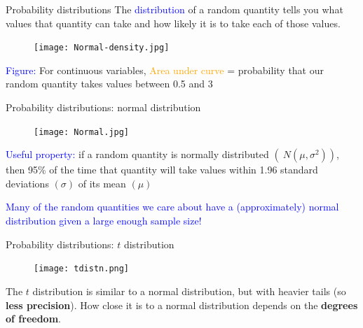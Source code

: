 \documentclass[10pt,t]{beamer}
\begin{document}
\begin{frame}{Probability distributions}
The \textcolor{blue}{distribution} of a random quantity tells you what values that quantity can take and how likely it is to take each of those values.

\begin{figure}
	\centering \texttt{[image: Normal-density.jpg]}
\end{figure}

\textcolor{blue}{Figure:} For continuous variables, \textcolor{orange}{Area under curve} = probability that our random quantity takes values between 0.5 and 3

\end{frame}



\begin{frame}{Probability distributions: normal distribution}

\begin{figure}
	\centering \texttt{[image: Normal.jpg]}
\end{figure}

\textcolor{blue}{Useful property:} if a random quantity is normally distributed $(~N(\mu, \sigma^2))$, then 95\% of the time that quantity will take values within 1.96 standard deviations $(\sigma)$ of its mean $(\mu)$

\vspace{0.3cm}

 \textcolor{blue}{Many of the random quantities we care about have a (approximately) normal distribution given a large enough sample size!} 

\end{frame}

\begin{frame}{Probability distributions: $t$ distribution}
\begin{figure}
	\centering \texttt{[image: tdistn.png]}
\end{figure}

The $t$ distribution is similar to a normal distribution, but with heavier tails (so \textbf{less precision}). How close it is to a normal distribution depends on the \textbf{degrees of freedom}.

\end{frame}
\end{document}
